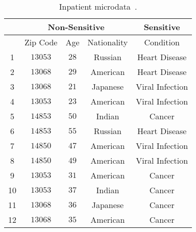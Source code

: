 \begin{table}[htbp]
    \centering
    \begin{tabular}{|c||c|c|c||c|}
        \hline \multicolumn{1}{|c||}{} & \multicolumn{3}{c||}{ Non-Sensitive } & Sensitive                                 \\
        \hline                         & Zip Code                              & Age       & Nationality & Condition       \\
        \hline 1                       & $13053$                               & $28$      & Russian     & Heart Disease   \\
        2                              & $13068$                               & $29$      & American    & Heart Disease   \\
        3                              & $13068$                               & $21$      & Japanese    & Viral Infection \\
        4                              & $13053$                               & $23$      & American    & Viral Infection \\
        5                              & $14853$                               & $50$      & Indian      & Cancer          \\
        6                              & $14853$                               & $55$      & Russian     & Heart Disease   \\
        7                              & $14850$                               & $47$      & American    & Viral Infection \\
        8                              & $14850$                               & $49$      & American    & Viral Infection \\
        9                              & $13053$                               & $31$      & American    & Cancer          \\
        10                             & $13053$                               & $37$      & Indian      & Cancer          \\
        11                             & $13068$                               & $36$      & Japanese    & Cancer          \\
        12                             & $13068$                               & $35$      & American    & Cancer          \\
        \hline
    \end{tabular}
    \caption{Inpatient microdata~\cite{machanavajjhala2007diversity}.}
    \label{tabular:inpatientmicrodata}
\end{table}
\FloatBarrier

